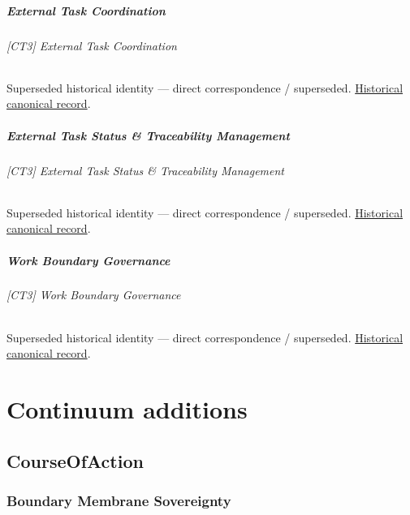 \paragraph{External Task Coordination}

\subparagraph{[CT3] External Task Coordination}

\par\label{element:32be309d65594592bac4d7b068def0d2}
Superseded historical identity — direct correspondence / superseded. \href{../../../../continuum/strategy/capability/32be309d65594592bac4d7b068def0d2.md}{Historical canonical record}.\par

\paragraph{External Task Status \& Traceability Management}

\subparagraph{[CT3] External Task Status \& Traceability Management}

\par\label{element:95985d244a234571892a9e9b4024f594}
Superseded historical identity — direct correspondence / superseded. \href{../../../../continuum/strategy/capability/95985d244a234571892a9e9b4024f594.md}{Historical canonical record}.\par

\paragraph{Work Boundary Governance}

\subparagraph{[CT3] Work Boundary Governance}

\par\label{element:b4d14abf930a4230a7f5b93e9ce3df91}
Superseded historical identity — direct correspondence / superseded. \href{../../../../continuum/strategy/capability/b4d14abf930a4230a7f5b93e9ce3df91.md}{Historical canonical record}.\par

\chapter{Continuum additions}

\section{CourseOfAction}

\subsection{Boundary Membrane Sovereignty}

